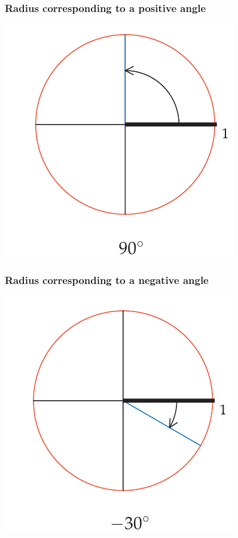 \documentclass{beamer}
\begin{document}
\begin{frame}
    \frametitle{Radius corresponding to a positive angle}
    \centering
    \includegraphics[scale=0.5]{1.png}

\end{frame}

\begin{frame}
    \frametitle{Radius corresponding to a negative angle}
    \centering
    \includegraphics[scale=0.5]{2.png}

\end{frame}
\end{document}
